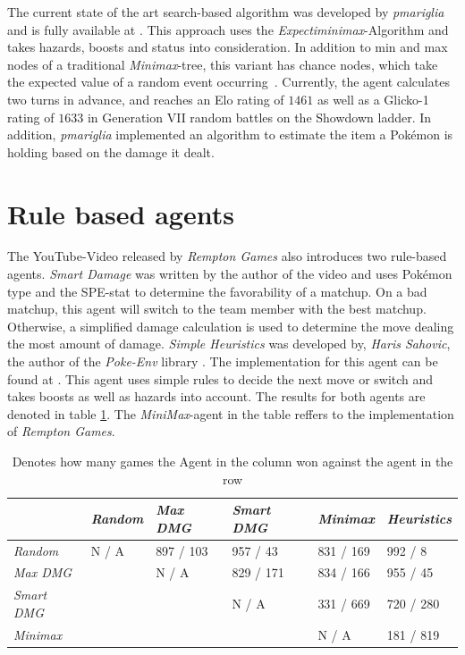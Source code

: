 The current state of the art search-based algorithm was developed by \emph{pmariglia} and is fully available
at \cite{Github:pmariglia-showdown}. This approach uses the \textit{Expectiminimax}-Algorithm and takes
hazards, boosts and status into consideration. In addition to \grqq min\grqq{}
and \grqq max\grqq{} nodes of a traditional \emph{Minimax}-tree, this variant has \grqq chance\grqq{} nodes, which take the 
expected value of a random event occurring~\autocite{wiki:Expectiminimax}. Currently, the agent calculates two turns in
advance, and reaches an Elo rating of $1461$ as well as a Glicko-1 rating of $1633$ in Generation VII random battles 
on the Showdown ladder. 
In addition, \emph{pmariglia} implemented an algorithm to estimate the item a Pokémon is holding
based on the damage it dealt. 

\section{Rule based agents}
\label{sec:related-rulebased}
The YouTube-Video released by \emph{Rempton Games} \cite{RemptonGames:PokemonAI} also introduces two rule-based agents.
\textit{Smart Damage} was written by the author of the video and uses Pokémon type and the \ac{SPE}-stat to determine
the favorability of a matchup. On a bad matchup, this agent will switch to the team member with the best matchup. Otherwise,
a simplified damage calculation is used to determine the move dealing the most amount of damage. \textit{Simple 
Heuristics} was developed by, \emph{Haris Sahovic}, the author of the \emph{Poke-Env} library \cite{PokeEnv:Github}.
The implementation for this agent can be found at \cite{PokeEnv:Baselines}. This agent uses simple rules
to decide the next move or switch and takes boosts as well as hazards into account. The results for both agents
are denoted in table \ref{tbl:Youtube-Results}. The \emph{MiniMax}-agent in the table reffers to the implementation
of \emph{Rempton Games}.
\begin{table}[h]
    \centering
        \begin{tabular}{|l|l|l|l|l|l|}
            \hline
            & \emph{Random} & \emph{Max \ac{DMG}} & \emph{Smart \ac{DMG}} & \emph{Minimax} & \emph{Heuristics} \\
            \hline
            \emph{Random} & N / A & 897 / 103 & 957 / 43 & 831 / 169 & 992 / 8 \\
            \hline
            \emph{Max \ac{DMG}} & & N / A & 829 / 171 & 834 / 166 & 955 / 45 \\
            \hline
            \emph{Smart \ac{DMG}} & & & N / A & 331 / 669 & 720 / 280 \\
            \hline
            \emph{Minimax} & & & & N / A & 181 / 819 \\
            \hline 
        \end{tabular}
        \caption{Denotes how many games the Agent in the column won against the agent in the row \cite{RemptonGames:PokemonAI}}
        \label{tbl:Youtube-Results}
\end{table}

